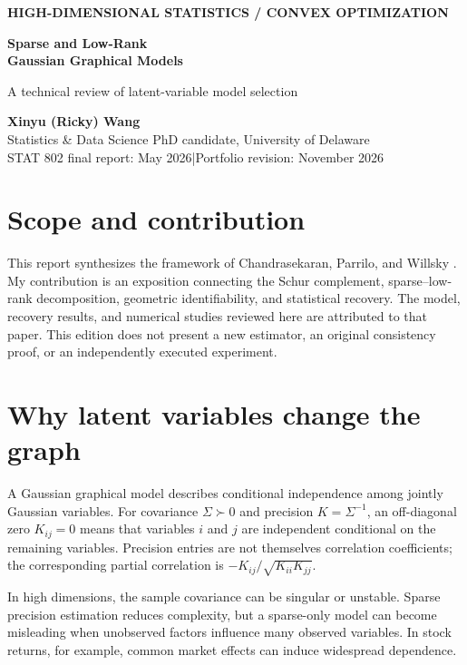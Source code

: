 \documentclass[11pt]{article}
\begin{document}
\thispagestyle{fancy}
{\small\bfseries\color{teal}HIGH-DIMENSIONAL STATISTICS / CONVEX OPTIMIZATION}\par
\vspace{4pt}
{\LARGE\bfseries\color{navy}Sparse and Low-Rank\\[3pt]Gaussian Graphical Models}\par
{\large A technical review of latent-variable model selection}\par
\vspace{3pt}
\textbf{Xinyu (Ricky) Wang}\\
Statistics \& Data Science PhD candidate, University of Delaware\\
STAT 802 final report: May 2026\quad |\quad Portfolio revision: November 2026

\section*{Scope and contribution}
This report synthesizes the framework of Chandrasekaran, Parrilo, and Willsky
\cite{cpw}. My contribution is an exposition connecting the Schur complement,
sparse--low-rank decomposition, geometric identifiability, and statistical recovery.
The model, recovery results, and numerical studies reviewed here are attributed
to that paper. This edition does not present a new estimator, an original
consistency proof, or an independently executed experiment.

\section{Why latent variables change the graph}
A Gaussian graphical model describes conditional independence among jointly
Gaussian variables. For covariance $\Sigma\succ0$ and precision $K=\Sigma^{-1}$,
an off-diagonal zero $K_{ij}=0$ means that variables $i$ and $j$ are independent
conditional on the remaining variables. Precision entries are not themselves
correlation coefficients; the corresponding partial correlation is
$-K_{ij}/\sqrt{K_{ii}K_{jj}}$.

In high dimensions, the sample covariance can be singular or unstable. Sparse
precision estimation reduces complexity, but a sparse-only model can become
misleading when unobserved factors influence many observed variables. In stock
returns, for example, common market effects can induce widespread dependence.
\end{document}
